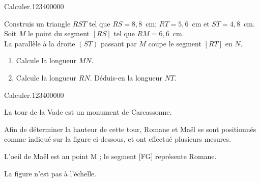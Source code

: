   



\begin{pageParcoursd} 
 


 

 
 
\begin{ExoCd}{Calculer.}{1234}{0}{0}{0}{0}{0}

Construis un triangle $RST$ tel que $RS=8,8$~cm; $RT=5,6$~cm et
 $ST=4,8$~cm.  Soit $M$ le point du segment $[RS]$ tel que
 $RM=6,6$~cm.\\La parallèle à la droite $(ST)$ passant par $M$
 coupe le segment $[RT]$ en $N$.
\begin{enumerate}[leftmargin=*]
\item Calcule la longueur $MN$.
\item Calcule la longueur $RN$. Déduis-en la longueur $NT$.
\end{enumerate}

\end{ExoCd}
 

\begin{ExoCd}{Calculer.}{1234}{0}{0}{0}{0}{0}


La tour de la Vade est un monument de Carcassonne.


 Afin de déterminer la hauteur de cette tour, Romane et Maël se sont positionnés comme indiqué sur la figure ci-dessous, et ont effectué plusieurs mesures.

L'oeil de Maël est au point M ; le segment [FG] représente Romane.

La figure n'est pas à l'échelle.

\begin{center}


\end{center}
\end{ExoCd}
\end{pageParcoursd}
